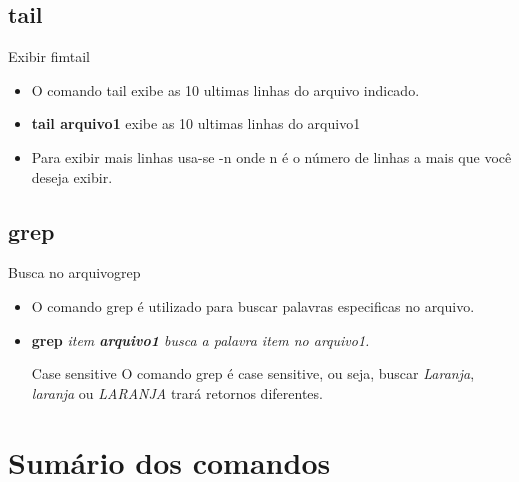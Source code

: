 \documentclass{beamer}
\begin{document}
\subsection{tail}
\begin{frame}{Exibir fim}{tail}
  \begin{itemize}
  \item {   O comando tail exibe as 10 ultimas linhas do arquivo indicado.
   } 
    \item{ \textbf{tail arquivo1} exibe as 10 ultimas linhas do arquivo1
    }
    \item{Para exibir mais linhas usa-se -n onde n é o número de linhas a mais que você deseja exibir.
  }
  \end{itemize}
\end{frame}

\subsection{grep}
\begin{frame}{Busca no arquivo}{grep}
  \begin{itemize}
  \item {  O comando grep é utilizado para buscar palavras especificas no arquivo.
   } 
    \item{ \textbf{grep} \textit{\textit{item} \textbf{arquivo1} busca a palavra item no arquivo1.
    }}
    \begin{block}{Case sensitive}
O comando grep é case sensitive, ou seja, buscar \textit{Laranja}, \textit{laranja} ou \textit{LARANJA} trará retornos diferentes.
\end{block}
  \end{itemize}
\end{frame}

\section*{Sumário dos comandos}
\end{document}
